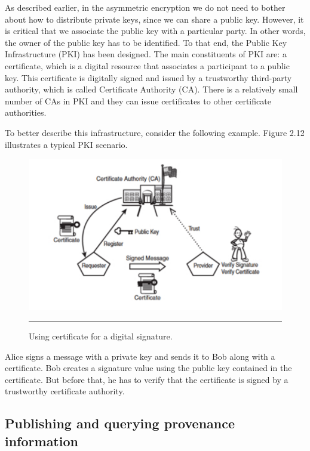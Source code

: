 As described earlier, in the asymmetric encryption we do not need to bother about how to distribute private keys, since we can share a public key. However, it is critical that we associate the public key with a particular party. In other words, the owner of the public key has to be identified. To that end, the Public Key Infrastructure (PKI)\cite{pki} has been designed. The main constituents of PKI are: a certificate, which is a digital resource that associates a participant to a public key. This certificate is digitally signed and issued by a trustworthy third-party authority, which is called Certificate Authority (CA). There is a relatively small number of CAs in PKI and they can issue certificates to other certificate authorities.

To better describe this infrastructure, consider the following example. Figure 2.12 illustrates a typical PKI scenario.

\begin{figure}[htbp]
	\centering
		\includegraphics{./Figures/figure15.pdf}
		\rule{35em}{0.5pt}
	\caption[Public Key Infrastructure]{Using certificate for a digital signature\cite{Graham:2001:BWS:559927}.}
	\label{fig:pki}
\end{figure}

Alice signs a message with a private key and sends it to Bob along with a certificate.  Bob creates a signature value using the public key contained in the certificate. But before that, he has to verify that the certificate is signed by a trustworthy certificate authority.

\subsection{Publishing and querying provenance information}

